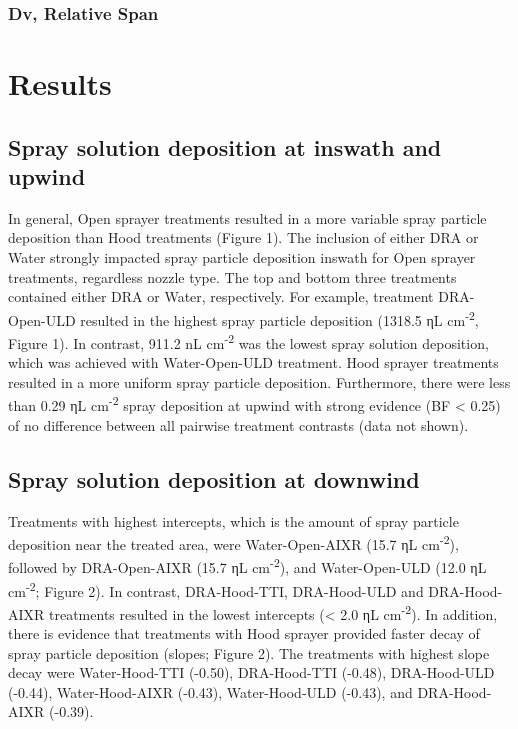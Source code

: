 \documentclass[
  12pt,
  a4paper,
]{article}
\begin{document}
\hypertarget{dv-relative-span}{%
\subsubsection{Dv, Relative Span}\label{dv-relative-span}}

\hypertarget{results}{%
\section{Results}\label{results}}

\hypertarget{spray-solution-deposition-at-inswath-and-upwind}{%
\subsection{Spray solution deposition at inswath and
upwind}\label{spray-solution-deposition-at-inswath-and-upwind}}

In general, Open sprayer treatments resulted in a more variable spray
particle deposition than Hood treatments (Figure 1). The inclusion of
either DRA or Water strongly impacted spray particle deposition inswath
for Open sprayer treatments, regardless nozzle type. The top and bottom
three treatments contained either DRA or Water, respectively. For
example, treatment DRA-Open-ULD resulted in the highest spray particle
deposition (1318.5 ηL cm\textsuperscript{-2}, Figure 1). In contrast,
911.2 nL cm\textsuperscript{-2} was the lowest spray solution
deposition, which was achieved with Water-Open-ULD treatment. Hood
sprayer treatments resulted in a more uniform spray particle deposition.
Furthermore, there were less than 0.29 ηL cm\textsuperscript{-2} spray
deposition at upwind with strong evidence (BF \textless{} 0.25) of no
difference between all pairwise treatment contrasts (data not shown).

\hypertarget{spray-solution-deposition-at-downwind-1}{%
\subsection{Spray solution deposition at
downwind}\label{spray-solution-deposition-at-downwind-1}}

Treatments with highest intercepts, which is the amount of spray
particle deposition near the treated area, were Water-Open-AIXR (15.7 ηL
cm\textsuperscript{-2}), followed by DRA-Open-AIXR (15.7 ηL
cm\textsuperscript{-2}), and Water-Open-ULD (12.0 ηL
cm\textsuperscript{-2}; Figure 2). In contrast, DRA-Hood-TTI,
DRA-Hood-ULD and DRA-Hood-AIXR treatments resulted in the lowest
intercepts (\textless{} 2.0 ηL cm\textsuperscript{-2}). In addition,
there is evidence that treatments with Hood sprayer provided faster
decay of spray particle deposition (slopes; Figure 2). The treatments
with highest slope decay were Water-Hood-TTI (-0.50), DRA-Hood-TTI
(-0.48), DRA-Hood-ULD (-0.44), Water-Hood-AIXR (-0.43), Water-Hood-ULD
(-0.43), and DRA-Hood-AIXR (-0.39).
\end{document}
